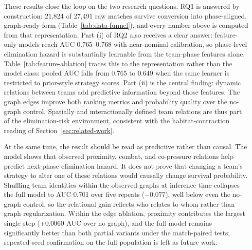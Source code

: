 These results close the loop on the two research questions. RQ1 is answered by
construction: 21,824 of 27,491 raw matches survive conversion into
phase-aligned, graph-ready form (Table~\ref{tab:data-funnel}), and every number
above is computed from that representation. Part (i) of RQ2 also receives a
clear answer: feature-only models reach AUC 0.765--0.768 with near-nominal
calibration, so phase-level elimination hazard is substantially learnable from
the team-phase features alone. Table~\ref{tab:feature-ablation} traces this to the representation rather
than the model class: pooled AUC falls from 0.765 to 0.649 when the same
learner is restricted to prior-style strategy scores. Part (ii) is the central finding: dynamic relations between teams add
predictive information beyond those features. The graph edges improve both
ranking metrics and probability quality over the no-graph control. Spatially
and interactionally defined team relations are thus part of the
elimination-risk environment, consistent with the habitat-contraction reading
of Section~\ref{sec:related-work}.

At the same time, the result should be read as predictive rather than causal.
The model shows that observed proximity, combat, and co-pressure relations help
predict next-phase elimination hazard. It does not prove that changing a team's
strategy to alter one of these relations would causally change survival
probability. Shuffling team identities within the observed graphs at
inference time collapses the full model to AUC 0.701 over five repeats
(\(-0.077\)), well below even the no-graph control, so the relational gain
reflects who relates to whom rather than graph regularization. Within the
edge ablation, proximity contributes the largest single step
(+0.0060 AUC over no graph), and the full model remains significantly better
than both partial variants under the match-paired tests; repeated-seed
confirmation on the full population is left as future work.
